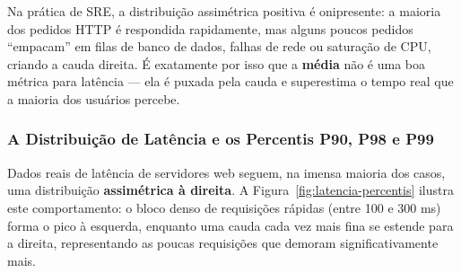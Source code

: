 \documentclass[12pt,a4paper]{report}
\begin{document}
Na prática de SRE, a distribuição assimétrica positiva é onipresente: a maioria dos pedidos HTTP é respondida rapidamente, mas alguns poucos pedidos ``empacam'' em filas de banco de dados, falhas de rede ou saturação de CPU, criando a cauda direita. É exatamente por isso que a \textbf{média} não é uma boa métrica para latência --- ela é puxada pela cauda e superestima o tempo real que a maioria dos usuários percebe.

\subsubsection{A Distribuição de Latência e os Percentis P90, P98 e P99}

Dados reais de latência de servidores web seguem, na imensa maioria dos casos, uma distribuição \textbf{assimétrica à direita}. A Figura~\ref{fig:latencia-percentis} ilustra este comportamento: o bloco denso de requisições rápidas (entre 100 e 300 ms) forma o pico à esquerda, enquanto uma cauda cada vez mais fina se estende para a direita, representando as poucas requisições que demoram significativamente mais.
\end{document}
